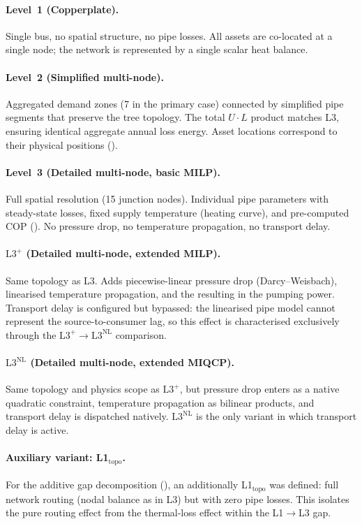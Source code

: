 \documentclass[a4paper,fleqn]{cas-dc}
\newcommand{\Lplus}{\mathrm{L3}^{+}}
\newcommand{\Lnl}{\mathrm{L3}^{\mathrm{NL}}}
\begin{document}
\paragraph{Level~1 (Copperplate).}
Single bus, no spatial structure, no pipe losses. All assets are
co-located at a single node; the network is represented by a
single scalar heat balance.

\paragraph{Level~2 (Simplified multi-node).}
Aggregated demand zones (7 in the primary case) connected by
simplified pipe segments that preserve the tree topology. The total
$U \cdot L$ product matches L3, ensuring identical aggregate annual
loss energy. Asset locations correspond to their physical positions
().

\paragraph{Level~3 (Detailed multi-node, basic MILP).}
Full spatial resolution (15 junction nodes). Individual pipe
parameters with steady-state losses, fixed supply temperature
(heating curve), and pre-computed COP (). No pressure
drop, no temperature propagation, no transport delay.

\paragraph{$\Lplus$ (Detailed multi-node, extended MILP).}
Same topology as L3. Adds piecewise-linear pressure drop
(Darcy--Weisbach), linearised temperature propagation, and the
resulting in the pumping power. Transport delay is configured but bypassed:
the linearised pipe model cannot represent the source-to-consumer
lag, so this effect is characterised exclusively through the
$\Lplus\!\to\!\Lnl$ comparison.

\paragraph{$\Lnl$ (Detailed multi-node, extended MIQCP).}
Same topology and physics scope as $\Lplus$, but pressure drop
enters as a native quadratic constraint, temperature propagation as
bilinear products, and transport delay is dispatched natively.
$\Lnl$ is the only variant in which transport delay is active.

\paragraph{Auxiliary variant: L1$_{\mathrm{topo}}$.}
For the additive gap decomposition (),
an additionally L1$_{\mathrm{topo}}$ was defined: full network routing
(nodal balance as in L3) but with zero pipe losses. This isolates
the pure routing effect from the thermal-loss effect within the
L1$\to$L3 gap.
\end{document}
